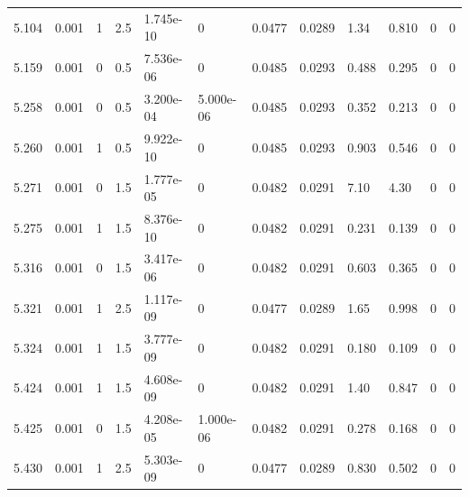 \documentclass[preview]{standalone}
\begin{document}
{{{{\begin{tabular}{L{1.2cm}C{1.2cm} C{0.3cm}C{0.5cm} C{1.4cm}C{1.4cm} C{1.4cm}C{1.4cm} C{1.6cm}C{1.6cm} C{1.6cm}C{1.6cm}}
  5.104  &  0.001  & 1     & 2.5 &  1.745e-10  & 0  &  0.0477&   0.0289& 1.34 & 0.810   &  0 & 0  \\ 
  5.159  &  0.001  & 0     & 0.5 &  7.536e-06  & 0  &  0.0485&   0.0293& 0.488 & 0.295   &  0 & 0  \\ 
  5.258  &  0.001  & 0     & 0.5 &  3.200e-04  & 5.000e-06  &  0.0485&   0.0293& 0.352 & 0.213   &  0 & 0  \\ 
  5.260  &  0.001  & 1     & 0.5 &  9.922e-10  & 0  &  0.0485&   0.0293& 0.903 & 0.546   &  0 & 0  \\ 
  5.271  &  0.001  & 0     & 1.5 &  1.777e-05  & 0  &  0.0482&   0.0291& 7.10 & 4.30   &  0 & 0  \\ 
  5.275  &  0.001  & 1     & 1.5 &  8.376e-10  & 0  &  0.0482&   0.0291& 0.231 & 0.139   &  0 & 0  \\ 
  5.316  &  0.001  & 0     & 1.5 &  3.417e-06  & 0  &  0.0482&   0.0291& 0.603 & 0.365   &  0 & 0  \\ 
  5.321  &  0.001  & 1     & 2.5 &  1.117e-09  & 0  &  0.0477&   0.0289& 1.65 & 0.998   &  0 & 0  \\ 
  5.324  &  0.001  & 1     & 1.5 &  3.777e-09  & 0  &  0.0482&   0.0291& 0.180 & 0.109   &  0 & 0  \\ 
  5.424  &  0.001  & 1     & 1.5 &  4.608e-09  & 0  &  0.0482&   0.0291& 1.40 & 0.847   &  0 & 0  \\ 
  5.425  &  0.001  & 0     & 1.5 &  4.208e-05  & 1.000e-06  &  0.0482&   0.0291& 0.278 & 0.168   &  0 & 0  \\ 
  5.430  &  0.001  & 1     & 2.5 &  5.303e-09  & 0  &  0.0477&   0.0289& 0.830 & 0.502   &  0 & 0  \\ 
\hline 
\end{tabular} 

}}}}
\end{document}
